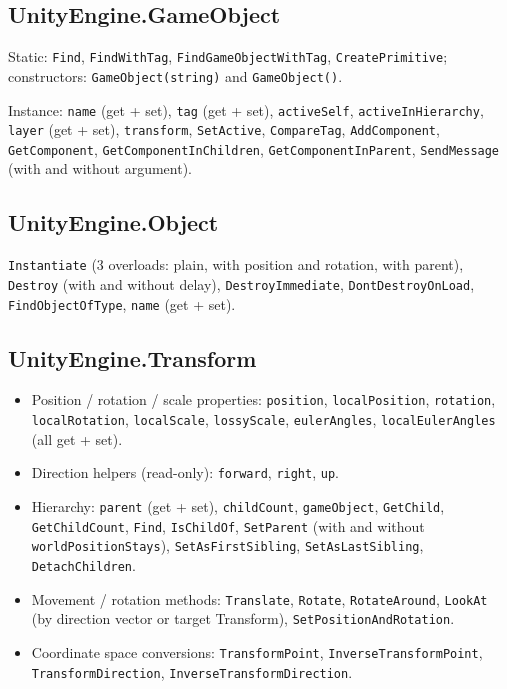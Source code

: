 \documentclass[11pt,a4paper]{article}
\newcommand{\code}[1]{\texttt{\small #1}}
\begin{document}
\subsection{UnityEngine.GameObject}

Static: \code{Find}, \code{FindWithTag}, \code{FindGameObjectWithTag},
\code{CreatePrimitive};
constructors: \code{GameObject(string)} and \code{GameObject()}.

Instance: \code{name} (get + set), \code{tag} (get + set),
\code{activeSelf}, \code{activeInHierarchy}, \code{layer} (get + set),
\code{transform}, \code{SetActive}, \code{CompareTag}, \code{AddComponent},
\code{GetComponent}, \code{GetComponentInChildren}, \code{GetComponentInParent},
\code{SendMessage} (with and without argument).

\subsection{UnityEngine.Object}

\code{Instantiate} (3 overloads: plain, with position and rotation, with parent),
\code{Destroy} (with and without delay), \code{DestroyImmediate},
\code{DontDestroyOnLoad}, \code{FindObjectOfType},
\code{name} (get + set).

\subsection{UnityEngine.Transform}

\begin{itemize}[leftmargin=2em, noitemsep]
  \item Position / rotation / scale properties:
        \code{position}, \code{localPosition}, \code{rotation},
        \code{localRotation}, \code{localScale}, \code{lossyScale},
        \code{eulerAngles}, \code{localEulerAngles} (all get + set).
  \item Direction helpers (read-only): \code{forward}, \code{right}, \code{up}.
  \item Hierarchy: \code{parent} (get + set), \code{childCount},
        \code{gameObject}, \code{GetChild}, \code{GetChildCount},
        \code{Find}, \code{IsChildOf},
        \code{SetParent} (with and without \code{worldPositionStays}),
        \code{SetAsFirstSibling}, \code{SetAsLastSibling},
        \code{DetachChildren}.
  \item Movement / rotation methods:
        \code{Translate}, \code{Rotate}, \code{RotateAround},
        \code{LookAt} (by direction vector or target Transform),
        \code{SetPositionAndRotation}.
  \item Coordinate space conversions:
        \code{TransformPoint}, \code{InverseTransformPoint},
        \code{TransformDirection}, \code{InverseTransformDirection}.
\end{itemize}
\end{document}
